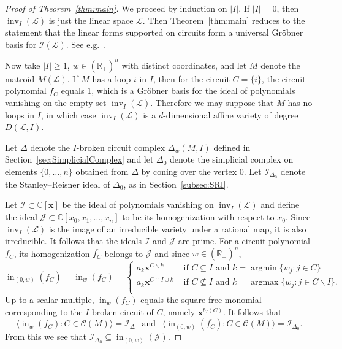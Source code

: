 \documentclass[10pt]{amsart}
\theoremstyle{definition}
\providecommand{\eg}{e.g.\ }
\newcommand{\R}{\mathbb{R}}
\newcommand{\Cbb}{\mathbb{C}}
\newcommand{\I}{\mathcal{I}}
\newcommand{\J}{\mathcal{J}}
\newcommand{\cL}{\mathcal{L}}
\newcommand{\CC}{\mathcal{C}}
\newcommand{\x}{\mathbf{x}}
\newcommand{\ol}{\overline}
\DeclareMathOperator{\In}{in}
\DeclareMathOperator{\inv}{inv}
\DeclareMathOperator{\argmin}{argmin}
\DeclareMathOperator{\argmax}{argmax}
\newcommand{\reldp}{\mathrel{:}}
\begin{document}
\begin{proof}[Proof of Theorem~\ref{thm:main}] 
We proceed by induction on $|I|$. If $|I|=0$, then $\inv_I(\cL)$ is just the linear space $\cL$. 
Then Theorem~\ref{thm:main} reduces to the statement that the linear forms supported on circuits 
form a universal Gr\"obner basis for $\I(\cL)$. See \eg \cite[Prop.~1.6]{GrobnerPolytope}.

Now take $|I|\geq 1$, $w\in (\R_+)^n$ with distinct coordinates, and let $M$ denote the matroid $M(\cL)$.
If $M$ has a loop $i$ in $I$, then for the circuit $C = \{i\}$, the circuit polynomial $f_C$ equals $1$, 
which is a Gr\"obner basis for the ideal of polynomials vanishing on the empty set $\inv_I(\cL)$. 
Therefore we may suppose that $M$ has no loops in $I$, in which case $\inv_I(\cL)$ is a $d$-dimensional 
affine variety of degree $D(\cL,I)$. 

Let $\Delta$ denote the $I$-broken circuit complex $\Delta_w(M,I)$
defined in Section~\ref{sec:SimplicialComplex} and let $\Delta_0$ denote the simplicial complex on elements $\{0,\ldots , n\}$ 
obtained from $\Delta$ by coning over the vertex $0$. Let $\I_{\Delta_0}$ denote the Stanley--Reisner ideal 
of $\Delta_0$, as in Section~\ref{subsec:SRI}. 


Let $\I \subset \Cbb[\x]$ be the ideal of polynomials vanishing on $\inv_I(\cL)$ 
and define the ideal $\J\subset \Cbb[x_0, x_1, \ldots , x_n]$ to be its homogenization with respect to $x_0$. 
Since $\inv_I(\cL)$ is the image of an irreducible variety under a rational map, it is also irreducible. 
It follows that the ideals $\I$ and $\J$ are prime. 
For a circuit polynomial $f_C$, its homogenization $\ol{f_C}$ belongs to $\J$ and since $w\in (\R_+)^n$, 
\[
\In_{(0,w)}(\ol{f_C}) = \In_{w}(f_C) = \begin{cases}
 a_k \x^{C\backslash k} & \text{ if $C \subseteq I $ and $k = \argmin \{w_j: j\in C\}$ } \\ 
 a_k \x^{C\cap I\cup k} & \text{ if $C \not\subseteq I $ and $k = \argmax \{w_j: j\in C\backslash I\}$. } \\ 
\end{cases}
\]
Up to a scalar multiple, $\In_{w}(f_C)$ equals the 
square-free monomial corresponding to the $I$-broken circuit of $C$, namely $\x^{b_I(C)}$. 
It follows that 
\[
\langle \In_{w}(f_C) \reldp C \in \CC (M) \rangle = \I_{\Delta}
\ \ 
\text{ and } 
\ \ 
\langle \In_{(0,w)}(\ol{f_C}) \reldp C \in \CC (M) \rangle = \I_{\Delta_0}. 
\]
From this we see that $\I_{\Delta_0} \subseteq \In_{(0,w)}(\J)$. 



\end{proof}
\end{document}
